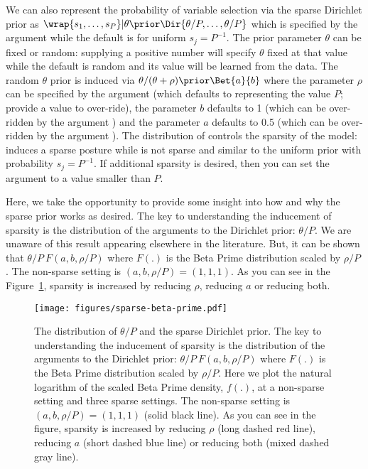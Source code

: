 \documentclass[article]{jss}
\begin{document}
We can also represent the probability of variable selection via the
sparse Dirichlet prior as
$\wrap{s_1, \dots, s_P}|\theta \prior \Dir{\theta/P, \dots, \theta/P}$ which
is specified by the argument  while the default is
 for uniform $s_j=P^{-1}$.  The prior parameter
$\theta$ can be fixed or random: supplying a positive number will specify
$\theta$ fixed at that value while the default  is random
and its value will be learned from the data.  The random $\theta$ prior
is induced via $\theta/(\theta+\rho) \prior \Bet{a}{b}$ where the
parameter $\rho$ can be specified by the argument  (which
defaults to  representing the value $P$; provide a value to
over-ride), the parameter $b$ defaults to 1 (which can be over-ridden
by the argument ) and the parameter $a$ defaults to 0.5 (which
can be over-ridden by the argument ).  The distribution of
 controls the sparsity of the model:  induces
a sparse posture while  is not sparse and similar to the
uniform prior with probability $s_j=P^{-1}$.  
If additional sparsity is desired,
then you can set the argument  to a value smaller than $P$.

Here, we take the opportunity to provide some insight into how and why
the sparse prior works as desired. The key to understanding the
inducement of sparsity is the distribution of the arguments to
the Dirichlet prior: $\theta/P$.  We are unaware of this result 
appearing elsewhere in the literature.  But, it can be
shown that $\theta/P ~ F(a, b, \rho/P)$ where $F(.)$ is the Beta Prime
distribution scaled by $\rho/P$ \citep{JohnKotz95}.  The non-sparse
setting is $(a, b, \rho/P)=(1, 1, 1)$.  As you can see in the
Figure~\ref{sparse}, sparsity is increased by reducing $\rho$, reducing
$a$ or reducing both.
\begin{figure}%
\begin{center}
\texttt{[image: figures/sparse-beta-prime.pdf]}
\end{center}
\caption{\label{sparse}
The distribution of $\theta/P$ and the sparse Dirichlet prior.
The key to understanding the inducement of sparsity is the 
distribution of the arguments to the Dirichlet prior: 
$\theta/P ~ F(a, b, \rho/P)$ where $F(.)$ is the Beta Prime
distribution scaled by $\rho/P$.  Here we plot the natural
logarithm of the scaled Beta Prime density, $f(.)$, at a
non-sparse setting and three sparse settings.  The non-sparse
setting is $(a, b, \rho/P)=(1, 1, 1)$ (solid black line).  As 
you can see in the figure, sparsity is increased by reducing $\rho$
(long dashed red line), reducing $a$ (short dashed blue line) or 
reducing both (mixed dashed gray line).
}
\end{figure}
\end{document}
